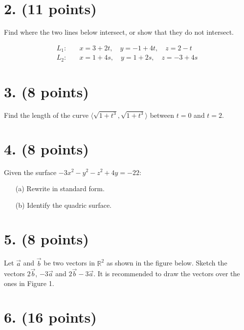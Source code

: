 \documentclass[12pt]{article}
\begin{document}
\newpage

\section*{2. (11 points)}

Find where the two lines below intersect, or show that they do not intersect.

\[
\begin{aligned}
L_1: & \quad x = 3 + 2t, \quad y = -1 + 4t, \quad z = 2 - t \\


L_2: & \quad x = 1 + 4s, \quad y = 1 + 2s, \quad z = -3 + 4s
\end{aligned}
\]

\newpage

\section*{3. (8 points)}

Find the length of the curve $\langle \sqrt{1 + t^3}, \sqrt{1 + t^3} \rangle$ between $t = 0$ and $t = 2$.

\section*{4. (8 points)}

Given the surface $-3x^2 - y^2 - z^2 + 4y = -22$:

\begin{itemize}
    \item[(a)] Rewrite in standard form.
    \item[(b)] Identify the quadric surface.
\end{itemize}

\newpage

\section*{5. (8 points)}

Let $\vec{a}$ and $\vec{b}$ be two vectors in $\mathbb{R}^2$ as shown in the figure below. Sketch the vectors $2\vec{b}$, $-3\vec{a}$ and $2\vec{b} - 3\vec{a}$. It is recommended to draw the vectors over the ones in Figure 1.

\newpage

\section*{6. (16 points)}
\end{document}
